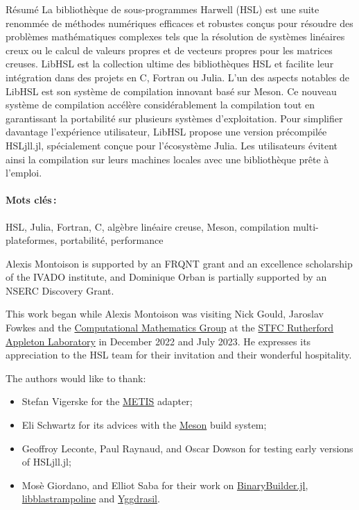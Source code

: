 \documentclass[gdweb]{geradwp}
\renewcommand{\_}{\raisebox{+0.35mm}{\textunderscore}}
\newcommand{\LibHSL}{LibHSL\xspace}
\newcommand{\HSLjll}{HSL\_jll.jl\xspace}
\begin{document}
\begin{GDabstract}{R\'esum\'e}
La bibliothèque de sous-programmes Harwell (HSL) est une suite renommée de méthodes numériques efficaces et robustes conçus pour résoudre des problèmes mathématiques complexes tels que la résolution de systèmes linéaires creux ou le calcul de valeurs propres et de vecteurs propres pour les matrices creuses.
\LibHSL est la collection ultime des bibliothèques HSL et facilite leur intégration dans des projets en C, Fortran ou Julia.
L'un des aspects notables de \LibHSL est son système de compilation innovant basé sur Meson.
Ce nouveau système de compilation accélère considérablement la compilation tout en garantissant la portabilité sur plusieurs systèmes d'exploitation.
Pour simplifier davantage l'expérience utilisateur, \LibHSL propose une version précompilée \HSLjll, spécialement conçue pour l'écosystème Julia.
Les utilisateurs évitent ainsi la compilation sur leurs machines locales avec une bibliothèque prête à l'emploi.

\paragraph{Mots cl\'es\,: }
HSL, Julia, Fortran, C, alg\`ebre lin\'eaire creuse, Meson, compilation multi-plateformes, portabilit\'e, performance
\end{GDabstract}

\begin{GDacknowledgements}
Alexis Montoison is supported by an FRQNT grant and an excellence scholarship of the IVADO institute, and Dominique Orban is partially supported by an NSERC Discovery Grant.

This work began while Alexis Montoison was visiting Nick Gould, Jaroslav Fowkes and the \href{https://www.numerical.rl.ac.uk/}{Computational Mathematics Group} at the \href{https://www.ukri.org/about-us/stfc/locations/rutherford-appleton-laboratory/}{STFC Rutherford Appleton Laboratory} in December 2022 and July 2023.
He expresses its appreciation to the HSL team for their invitation and their wonderful hospitality.

The authors would like to thank:
\begin{itemize}
  \item Stefan Vigerske for the \href{https://github.com/KarypisLab/METIS}{METIS} adapter;
  \item Eli Schwartz for its advices with the \href{https://mesonbuild.com/}{Meson} build system;
  \item Geoffroy Leconte, Paul Raynaud, and Oscar Dowson for testing early versions of \HSLjll;
  \item Mosè Giordano, and Elliot Saba for their work on \href{https://github.com/JuliaPackaging/BinaryBuilder.jl}{BinaryBuilder.jl}, \href{https://github.com/JuliaLinearAlgebra/libblastrampoline}{libblastrampoline} and \href{https://github.com/JuliaPackaging/Yggdrasil}{Yggdrasil}.
\end{itemize}
\end{GDacknowledgements}
\end{document}
